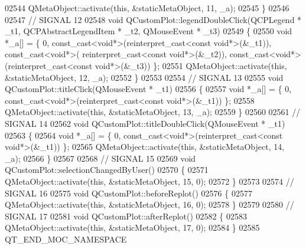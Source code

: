 \begin{DoxyCode}
02544     QMetaObject::activate(\textcolor{keyword}{this}, &staticMetaObject, 11, \_a);
02545 \}
02546 
02547 \textcolor{comment}{// SIGNAL 12}
02548 \textcolor{keywordtype}{void} QCustomPlot::legendDoubleClick(QCPLegend * \_t1, QCPAbstractLegendItem * \_t2, QMouseEvent * \_t3)
02549 \{
02550     \textcolor{keywordtype}{void} *\_a[] = \{ 0, \textcolor{keyword}{const\_cast<}\textcolor{keywordtype}{void}*\textcolor{keyword}{>}(\textcolor{keyword}{reinterpret\_cast<}\textcolor{keyword}{const }\textcolor{keywordtype}{void}*\textcolor{keyword}{>}(&\_t1)), \textcolor{keyword}{const\_cast<}\textcolor{keywordtype}{void}*\textcolor{keyword}{>}(\textcolor{keyword}{
      reinterpret\_cast<}\textcolor{keyword}{const }\textcolor{keywordtype}{void}*\textcolor{keyword}{>}(&\_t2)), \textcolor{keyword}{const\_cast<}\textcolor{keywordtype}{void}*\textcolor{keyword}{>}(\textcolor{keyword}{reinterpret\_cast<}\textcolor{keyword}{const }\textcolor{keywordtype}{void}*\textcolor{keyword}{>}(&\_t3)) \};
02551     QMetaObject::activate(\textcolor{keyword}{this}, &staticMetaObject, 12, \_a);
02552 \}
02553 
02554 \textcolor{comment}{// SIGNAL 13}
02555 \textcolor{keywordtype}{void} QCustomPlot::titleClick(QMouseEvent * \_t1)
02556 \{
02557     \textcolor{keywordtype}{void} *\_a[] = \{ 0, \textcolor{keyword}{const\_cast<}\textcolor{keywordtype}{void}*\textcolor{keyword}{>}(\textcolor{keyword}{reinterpret\_cast<}\textcolor{keyword}{const }\textcolor{keywordtype}{void}*\textcolor{keyword}{>}(&\_t1)) \};
02558     QMetaObject::activate(\textcolor{keyword}{this}, &staticMetaObject, 13, \_a);
02559 \}
02560 
02561 \textcolor{comment}{// SIGNAL 14}
02562 \textcolor{keywordtype}{void} QCustomPlot::titleDoubleClick(QMouseEvent * \_t1)
02563 \{
02564     \textcolor{keywordtype}{void} *\_a[] = \{ 0, \textcolor{keyword}{const\_cast<}\textcolor{keywordtype}{void}*\textcolor{keyword}{>}(\textcolor{keyword}{reinterpret\_cast<}\textcolor{keyword}{const }\textcolor{keywordtype}{void}*\textcolor{keyword}{>}(&\_t1)) \};
02565     QMetaObject::activate(\textcolor{keyword}{this}, &staticMetaObject, 14, \_a);
02566 \}
02567 
02568 \textcolor{comment}{// SIGNAL 15}
02569 \textcolor{keywordtype}{void} QCustomPlot::selectionChangedByUser()
02570 \{
02571     QMetaObject::activate(\textcolor{keyword}{this}, &staticMetaObject, 15, 0);
02572 \}
02573 
02574 \textcolor{comment}{// SIGNAL 16}
02575 \textcolor{keywordtype}{void} QCustomPlot::beforeReplot()
02576 \{
02577     QMetaObject::activate(\textcolor{keyword}{this}, &staticMetaObject, 16, 0);
02578 \}
02579 
02580 \textcolor{comment}{// SIGNAL 17}
02581 \textcolor{keywordtype}{void} QCustomPlot::afterReplot()
02582 \{
02583     QMetaObject::activate(\textcolor{keyword}{this}, &staticMetaObject, 17, 0);
02584 \}
02585 QT\_END\_MOC\_NAMESPACE
\end{DoxyCode}
